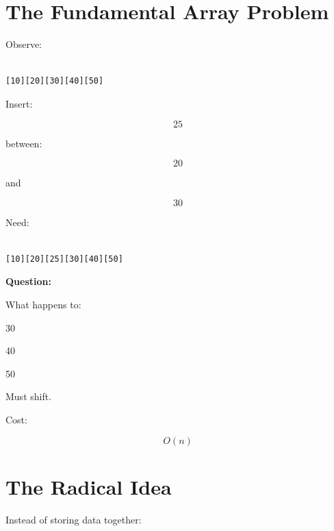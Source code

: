 \documentclass[11pt,a4paper]{book}
\begin{document}
\section{The Fundamental Array Problem}

Observe:

\begin{verbatim}

[10][20][30][40][50]

\end{verbatim}


Insert:

\[
25
\]

between:

\[
20
\]

and

\[
30
\]


Need:

\begin{verbatim}

[10][20][25][30][40][50]

\end{verbatim}


\textbf{\textbf{Question:}}

What happens to:


30

40

50


Must shift.


Cost:

\[
O(n)
\]


\section{The Radical Idea}

Instead of storing data together:

\end{document}

